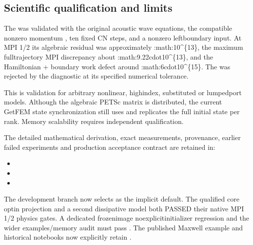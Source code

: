 \documentclass[letterpaper,10pt,english]{sphinxmanual}
\begin{document}
\subsection{Scientific qualification and limits}
\label{\detokenize{initialization:scientific-qualification-and-limits}}
\sphinxAtStartPar
The  was validated with
the original acoustic wave equations, the compatible
nonzero momentum , ten fixed CN
steps, and a nonzero left\sphinxhyphen{}boundary input.
At MPI 1/2 its algebraic residual was approximately
:math:\textasciigrave{}10\textasciicircum{}\{\sphinxhyphen{}13\}\textasciigrave{}, the maximum full\sphinxhyphen{}trajectory
MPI discrepancy about :math:\textasciigrave{}9.22cdot10\textasciicircum{}\{\sphinxhyphen{}13\}\textasciigrave{},
and the Hamiltonian + boundary work defect around
:math:\textasciigrave{}6cdot10\textasciicircum{}\{\sphinxhyphen{}15\}\textasciigrave{}.
The  was rejected by the
diagnostic at its specified numerical tolerance.

\sphinxAtStartPar
This is  validation for arbitrary nonlinear,
high\sphinxhyphen{}index, substituted or lumped\sphinxhyphen{}port models.
Although the algebraic PETSc matrix is distributed,
the current GetFEM state synchronization still
uses  and replicates the full
initial state per rank. Memory scalability
requires independent qualification.

\sphinxAtStartPar
The detailed mathematical derivation, exact
measurements, provenance, earlier failed experiments
and production acceptance contract are retained in:
\begin{itemize}
\item {} 
\sphinxAtStartPar
{}

\item {} 
\sphinxAtStartPar
{}

\item {} 
\sphinxAtStartPar
{}

\end{itemize}

\sphinxAtStartPar
{}
The development branch now selects  as
the implicit default. The qualified core opt\sphinxhyphen{}in
projection and a second dissipative model both
PASSED their native MPI 1/2 physics gates.
A dedicated frozen\sphinxhyphen{}image no\sphinxhyphen{}explicit\sphinxhyphen{}initializer
regression and the wider examples/memory audit
must pass .
The published Maxwell example and historical
notebooks now explicitly retain .
\end{document}

